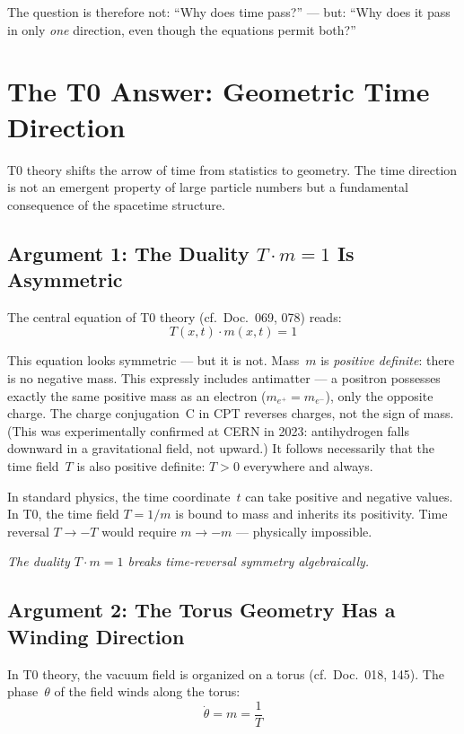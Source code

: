 The question is therefore not: ``Why does time pass?'' --- but: ``Why does it pass in only \emph{one} direction, even though the equations permit both?''


\section{The T0 Answer: Geometric Time Direction}

T0 theory shifts the arrow of time from statistics to geometry. The time direction is not an emergent property of large particle numbers but a fundamental consequence of the spacetime structure.

\subsection{Argument 1: The Duality $T \cdot m = 1$ Is Asymmetric}

The central equation of T0 theory (cf.\ Doc.~069, 078) reads:
\begin{equation}
	T(x,t) \cdot m(x,t) = 1
\end{equation}

This equation looks symmetric --- but it is not. Mass~$m$ is \emph{positive definite}: there is no negative mass. This expressly includes antimatter --- a positron possesses exactly the same positive mass as an electron ($m_{e^+} = m_{e^-}$), only the opposite charge. The charge conjugation~C in CPT reverses charges, not the sign of mass. (This was experimentally confirmed at CERN in 2023: antihydrogen falls downward in a gravitational field, not upward.) It follows necessarily that the time field~$T$ is also positive definite: $T > 0$ everywhere and always.

In standard physics, the time coordinate~$t$ can take positive and negative values. In T0, the time field $T = 1/m$ is bound to mass and inherits its positivity. Time reversal $T \to -T$ would require $m \to -m$ --- physically impossible.

\emph{The duality $T \cdot m = 1$ breaks time-reversal symmetry algebraically.}

\subsection{Argument 2: The Torus Geometry Has a Winding Direction}

In T0 theory, the vacuum field is organized on a torus (cf.\ Doc.~018, 145). The phase~$\theta$ of the field winds along the torus:
\begin{equation}
	\dot{\theta} = m = \frac{1}{T}
\end{equation}

